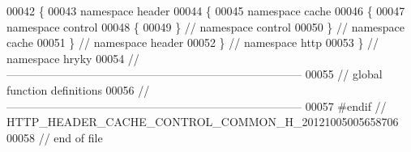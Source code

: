 \begin{DoxyCode}
00042 \{
00043 \textcolor{keyword}{namespace }header
00044 \{
00045 \textcolor{keyword}{namespace }cache
00046 \{
00047 \textcolor{keyword}{namespace }control
00048 \{
00049 \} \textcolor{comment}{// namespace control}
00050 \} \textcolor{comment}{// namespace cache}
00051 \} \textcolor{comment}{// namespace header}
00052 \} \textcolor{comment}{// namespace http}
00053 \} \textcolor{comment}{// namespace hryky}
00054 \textcolor{comment}{//
      ------------------------------------------------------------------------------}
00055 \textcolor{comment}{// global function definitions}
00056 \textcolor{comment}{//
      ------------------------------------------------------------------------------}
00057 \textcolor{preprocessor}{#endif // HTTP\_HEADER\_CACHE\_CONTROL\_COMMON\_H\_20121005005658706}
00058 \textcolor{preprocessor}{}\textcolor{comment}{// end of file}
\end{DoxyCode}
